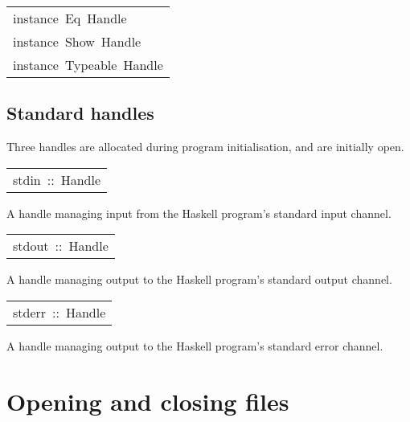 \begin{haddockdesc}
\end{haddockdesc}
\begin{haddockdesc}
\item[\begin{tabular}{@{}l}
instance\ Eq\ Handle\\instance\ Show\ Handle\\instance\ Typeable\ Handle
\end{tabular}]
\end{haddockdesc}
\subsection{Standard handles
}
Three handles are allocated during program initialisation,
 and are initially open.
\par

\begin{haddockdesc}
\item[\begin{tabular}{@{}l}
stdin\ ::\ Handle
\end{tabular}]\haddockbegindoc
A handle managing input from the Haskell program's standard input channel.
\par

\end{haddockdesc}
\begin{haddockdesc}
\item[\begin{tabular}{@{}l}
stdout\ ::\ Handle
\end{tabular}]\haddockbegindoc
A handle managing output to the Haskell program's standard output channel.
\par

\end{haddockdesc}
\begin{haddockdesc}
\item[\begin{tabular}{@{}l}
stderr\ ::\ Handle
\end{tabular}]\haddockbegindoc
A handle managing output to the Haskell program's standard error channel.
\par

\end{haddockdesc}
\section{Opening and closing files
}
